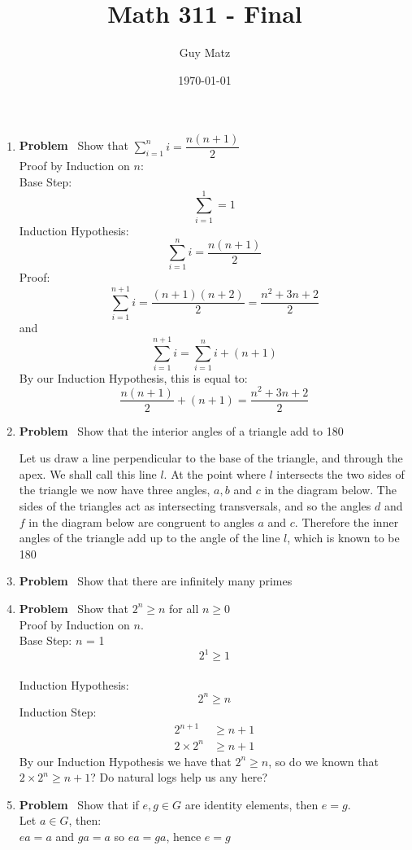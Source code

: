 \documentclass[12pt]{amsart}
\title{\textbf{Math 311 - Final}}
\author{Guy Matz}
\date{\today}
\theoremstyle{definition}
\newcommand{\itep}{\item {\bfseries Problem}\ }
\begin{document}
 

\maketitle

\begin{enumerate}[series=p]
\itep 
\label{drp}
Show that $\sum_{i=1}^{n} i = \dfrac{n(n+1)}{2}$
\\
Proof by Induction on $n$:
\\
Base Step: 
$$\sum_{i=1}^{1} = 1$$
Induction Hypothesis:
$$\sum_{i=1}^{n} i = \dfrac{n(n+1)}{2}$$
Proof:
$$\sum_{i=1}^{n+1} i = \dfrac{(n+1)(n+2)}{2} = \dfrac{n^2 + 3n + 2}{2}$$
and $$\sum_{i=1}^{n+1} i = \sum_{i=1}^{n} i + (n+1)$$
By our Induction Hypothesis, this is equal to:
\\
$$\dfrac{n(n+1)}{2} + (n+1) = \dfrac{n^2 + 3n + 2}{2}$$
\newpage

\itep
Show that the interior angles of a triangle add to 180

Let us draw a line perpendicular to the base of the triangle, and through the apex.  We shall call this line $l$.  At the point where $l$ intersects the two sides of the triangle we now have three angles, $a, b$ and $c$ in the diagram below.  The sides of the triangles act as intersecting transversals, and so the angles $d$ and $f$ in the diagram below are congruent to angles $a$ and $c$. Therefore the inner angles of the triangle add up to the angle of the line $l$, which is known to be 180
\\
\newpage

\itep
Show that there are infinitely many primes
\\

\newpage

\itep
Show that $2^n \geq n$ for all $n \geq 0$
\\
Proof by Induction on $n$.\\
Base Step: $n$ = 1
$$2^1 \geq 1$$
\\
Induction Hypothesis:\\
$$2^n \geq n$$
Induction Step:\\
\begin{align*}
2^{n+1} &\geq  n+1\\
2 \times 2^n &\geq n + 1
\end{align*}
By our Induction Hypothesis we have that $2^n \geq n$,
so do we known that $2 \times 2^n \geq n+1$?  Do natural logs help us any here?
\newpage

\itep
Show that if $e, g \in G$ are identity elements, then $e = g$.
\\
Let $a \in G$, then:\\
$ ea = a$ and $ga = a$ so $ea = ga$, hence $e = g$
\end{enumerate}
\end{document}
